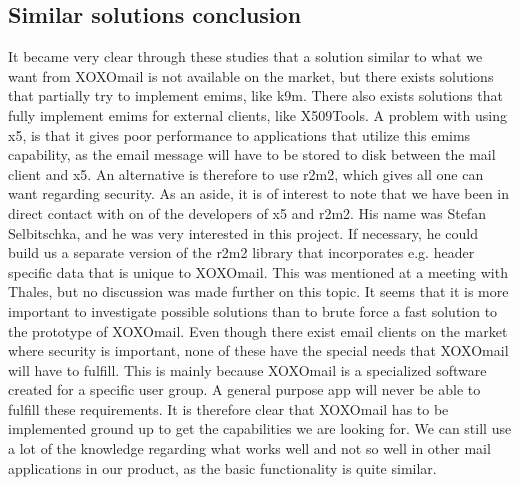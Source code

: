 \subsection{Similar solutions conclusion}
It became very clear through these studies that a solution similar to what we want from XOXOmail is not available on the market, but there exists solutions that partially try to implement \gls{emims}, like \gls{k9m}. There also exists solutions that fully implement \gls{emims} for external clients, like X509Tools. A problem with using \gls{x5}, is that it gives poor performance to applications that utilize this \gls{emims} capability, as the email message will have to be stored to disk between the mail client and \gls{x5}. An alternative is therefore to use \gls{r2m2}, which gives all one can want regarding security.
\newline
\newline
As an aside, it is of interest to note that we have been in direct contact with on of the developers of \gls{x5} and \gls{r2m2}. His name was Stefan Selbitschka, and he was very interested in this project. If necessary, he could build us a separate version of the \gls{r2m2} library that incorporates e.g. header specific data that is unique to XOXOmail. This was mentioned at a meeting with Thales, but no discussion was made further on this topic. It seems that it is more important to investigate possible solutions than to brute force a fast solution to the prototype of XOXOmail.
\newline
\newline
Even though there exist email clients on the market where security is important, none of these have the special needs that XOXOmail will have to fulfill. This is mainly because XOXOmail is a specialized software created for a specific user group. A general purpose app will never be able to fulfill these requirements. It is therefore clear that XOXOmail has to be implemented ground up to get the capabilities we are looking for. We can still use a lot of the knowledge regarding what works well and not so well in other mail applications in our product, as the basic functionality is quite similar.

